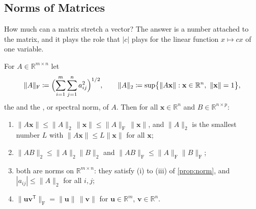 \subsection{Norms of Matrices}

How much can a matrix stretch a vector? The answer is a number attached to the matrix, and it plays the role that $|c|$ plays for the linear function $x\mapsto cx$ of one variable.

\begin{proposition}
\label{prop:matrix-norms}
For $A\in\mathbb R^{m\times n}$ let
\[
\|A\|_{\mathrm F}\coloneqq\Bigl(\sum_{i=1}^m\sum_{j=1}^na_{ij}^2\Bigr)^{1/2},\qquad\|A\|_2\coloneqq\sup\bigl\{\|A\mathbf x\|: \mathbf x\in\mathbb R^n,\ \|\mathbf x\|=1\bigr\},
\]
the  and the , or spectral norm, of $A$. Then for all $\mathbf x\in\mathbb R^n$ and $B\in\mathbb R^{n\times p}$:
\begin{enumerate}
\item $\|A\mathbf x\|\le\|A\|_2\,\|\mathbf x\|\le\|A\|_{\mathrm F}\,\|\mathbf x\|$, and $\|A\|_2$ is the smallest number $L$ with $\|A\mathbf x\|\le L\|\mathbf x\|$ for all $\mathbf x$;
\item $\|AB\|_2\le\|A\|_2\|B\|_2$ and $\|AB\|_{\mathrm F}\le\|A\|_{\mathrm F}\|B\|_{\mathrm F}$;
\item both are norms on $\mathbb R^{m\times n}$: they satisfy (i) to (iii) of \cref{prop:norm}, and $|a_{ij}|\le\|A\|_2$ for all $i,j$;
\item $\|\mathbf u\mathbf v^{\mathsf T}\|_{\mathrm F}=\|\mathbf u\|\,\|\mathbf v\|$ for $\mathbf u\in\mathbb R^m$, $\mathbf v\in\mathbb R^n$.
\end{enumerate}
\end{proposition}

